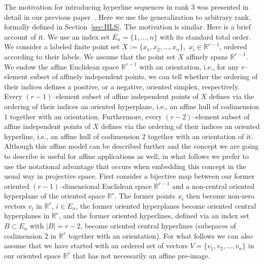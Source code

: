\documentclass[a4paper]{amsart}
\theoremstyle{definition}
\theoremstyle{remark}
\begin{document}
The motivation for introducing hyperline sequences in rank 3 was
presented in detail in our previous paper~\cite{bokowskimockstreinu}.
Here we use the generalization to arbitrary rank, formally defined in
Section~\ref{sec:HLS}.  The motivation is similar. Here is a brief
account of it. 
%
We use an index set $E_n = \{1,\dots,n\}$ with its standard total
order.  We consider a labeled finite point set $X:=\{x_1,x_2,\ldots,
x_n\},$ $x_i \in \mathbb R^{r-1}$, ordered according to their labels.
%
We assume that the point set $X$ affinely spans $\mathbb R^{r-1}$. 
%
We endow the affine Euclidean space $\mathbb R^{r-1}$ with an orientation, 
i.e., for any $r$--element subset of affinely independent points, 
we can tell whether the ordering of their indices 
defines a positive, or a negative, oriented simplex, respectively.
%
Every $(r-1)$--element subset of affine independent points of $X$ 
defines via the ordering of their indices an oriented hyperplane, 
i.e., an affine hull of codimension $1$ together with an orientation.
%
Furthermore, every $(r-2)$--element subset of affine independent points of $X$ 
defines via the ordering of their indices an oriented hyperline,
i.e., an affine hull of codimension 2 together with an orientation of it. 
%
Although this affine model can be described further and 
the concept we are going to describe
is useful for affine applications as well, 
in what follows we prefer to use the notational advantage that occurs 
when embedding this concept in the usual way in projective space. 
%
First consider a bijective map between our former 
oriented $(r-1)$--dimensional Euclidean space $\mathbb R^{r-1}$ 
and a non-central oriented hyperplane of the oriented space $\mathbb R^{r}$. 
%
The former points $x_i$ then become non-zero vectors $v_i$ in $\mathbb R^{r}$,
$i \in E_n$, the former oriented hyperplanes become
oriented central hyperplanes in $\mathbb R^{r}$, 
and the former oriented hyperlines, defined via an index set 
$B \subset E_n$ with $|B|=r-2$, become 
oriented central hyperlines (subspaces of codimension 2 in $\mathbb R^{r}$ 
together with an orientation). For what follows we can also assume 
that we have started with an ordered set of vectors 
$V=\{v_1,v_2,\ldots, v_n\}$ in our oriented space $\mathbb R^{r}$ 
that has not necessarily an affine pre-image. 
\end{document}
